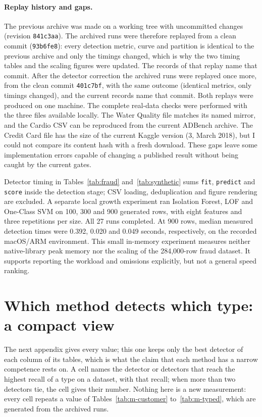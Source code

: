 \documentclass[conference]{IEEEtran}
\begin{document}
\paragraph{Replay history and gaps.}
The previous archive was made on a working tree with uncommitted changes (revision
\texttt{841c3aa}). The archived runs were therefore replayed from a clean commit
(\texttt{93b6fe8}): every detection metric, curve and partition is identical to the previous
archive and only the timings changed, which is why the two timing tables and the scaling figures
were updated. The records of that replay name that commit. After the detector correction the archived runs were replayed once more, from the clean commit \texttt{401c7bf}, with the same outcome (identical metrics, only timings changed), and the current records name that commit. Both replays were produced on one machine. The complete real-data checks were performed with the three files
available locally. The Water Quality file matches its named mirror, and the Cardio CSV can be
reproduced from the current ADBench archive. The Credit Card file has the size of the current
Kaggle version (3, March 2018), but I could not compare its content hash with a fresh download.
These gaps leave some implementation errors capable of changing a published result without being
caught by the current gates.

Detector timing in Tables~\ref{tab:fraud} and~\ref{tab:synthetic} sums
\texttt{fit}, \texttt{predict} and \texttt{score} inside the detection
stage; CSV loading, deduplication and figure rendering are excluded. A
separate local growth experiment ran Isolation Forest, LOF and One-Class
SVM on 100, 300 and 900 generated rows, with eight features and three
repetitions per size. All 27 runs completed. At 900 rows, median measured
detection times were 0.392, 0.020 and 0.049 seconds, respectively, on the
recorded macOS/ARM environment. This small in-memory experiment measures
neither native-library peak memory nor the scaling of the 284,000-row
fraud dataset. It supports reporting the workload and omissions explicitly,
but not a general speed ranking.

\section{Which method detects which type: a compact view}
\label{app:compact}
The next appendix gives every value; this one keeps only the best detector of each
column of its tables, which is what the claim that each method has a narrow
competence rests on.
A cell names the detector or detectors that reach the highest recall of a type on a
dataset, with that recall; when more than two detectors tie, the cell gives their
number.
Nothing here is a new measurement: every cell repeats a value of
Tables~\ref{tab:m-customer} to~\ref{tab:m-typed}, which are generated from the
archived runs.
\end{document}
